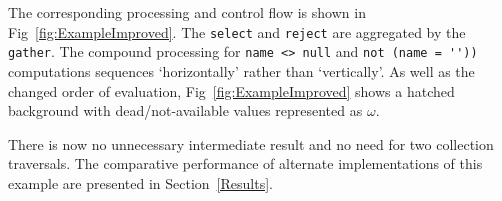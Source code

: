 \documentclass[
]{ceurart}
\begin{document}


The corresponding processing and control flow is shown in Fig~\ref{fig:ExampleImproved}. The  \verb!select! and  \verb!reject! are aggregated by the \verb!gather!. The compound processing for \verb!name <> null! and \verb!not (name = ''))! computations sequences `horizontally' rather than `vertically'. 
As well as the changed order of evaluation, Fig~\ref{fig:ExampleImproved} shows a hatched background with dead/not-available values represented as $\omega$.

There is now no unnecessary intermediate result and no need for two collection traversals. The comparative performance of alternate implementations of this example are presented in Section~\ref{Results}.

\end{document}
